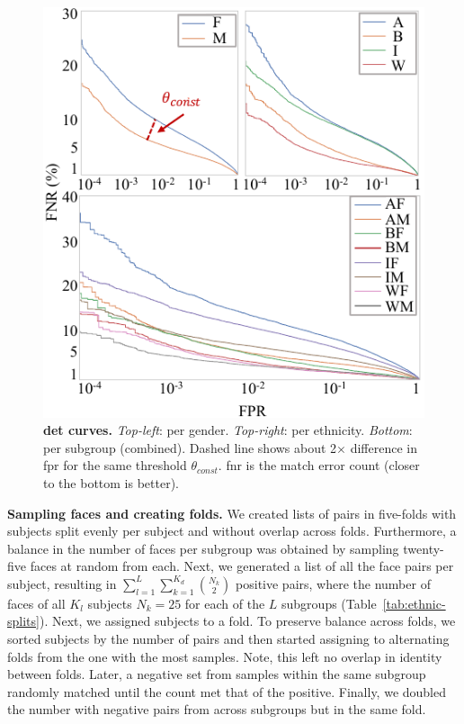 \begin{figure}[!t] 
	\centering    
	\includegraphics[width=.9\linewidth]{figures/detcurve-improved.pdf}
		\caption{\small{\textbf{\gls{det} curves.} \emph{Top-left}: per gender. \emph{Top-right}: per ethnicity. \emph{Bottom}: per subgroup (\ie combined). Dashed line shows about 2$\times$ difference in \gls{fpr} for the same threshold $\theta_{const}$. \gls{fnr} is the match error count (closer to the bottom is better).}}
\label{fig:detcurves} 
\end{figure} 
\noindent\textbf{Sampling faces and creating folds.} We created lists of pairs in five-folds with subjects split evenly per subject and without overlap across folds. Furthermore, a balance in the number of faces per subgroup was obtained by sampling twenty-five faces at random from each. Next, we generated a list of all the face pairs per subject, resulting in $\sum_{l=1}^{L}\sum_{k=1}^{K_d} {N_k \choose 2}$ positive pairs, where the number of faces of all $K_l$ subjects $N_k=25$  for each of the $L$ subgroups (Table~\ref{tab:ethnic-splits}). Next, we assigned subjects to a fold. To preserve balance across folds, we sorted subjects by the number of pairs and then started assigning to alternating folds from the one with the most samples. Note, this left no overlap in identity between folds. Later, a negative set from samples within the same subgroup randomly matched until the count met that of the positive. Finally, we doubled the number with negative pairs from across subgroups but in the same fold.

